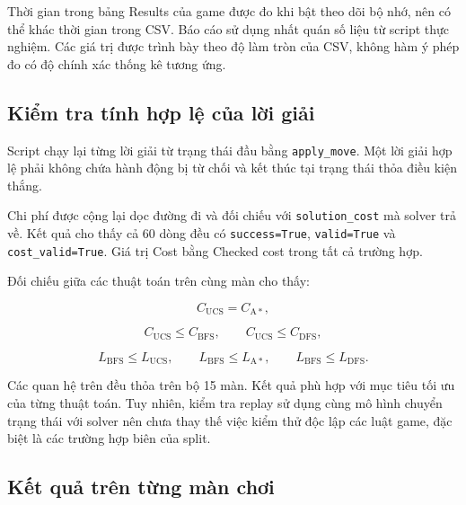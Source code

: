 Thời gian trong bảng Results của game được đo khi bật theo dõi
bộ nhớ, nên có thể khác thời gian trong CSV. Báo cáo sử dụng
nhất quán số liệu từ script thực nghiệm. Các giá trị được
trình bày theo độ làm tròn của CSV, không hàm ý phép đo có
độ chính xác thống kê tương ứng.

\subsection{Kiểm tra tính hợp lệ của lời giải}

Script chạy lại từng lời giải từ trạng thái đầu bằng
\texttt{apply\_move}. Một lời giải hợp lệ phải không chứa
hành động bị từ chối và kết thúc tại trạng thái thỏa
điều kiện thắng.

Chi phí được cộng lại dọc đường đi và đối chiếu với
\texttt{solution\_cost} mà solver trả về. Kết quả cho thấy
cả 60 dòng đều có \texttt{success=True},
\texttt{valid=True} và \texttt{cost\_valid=True}.
Giá trị Cost bằng Checked cost trong tất cả trường hợp.

Đối chiếu giữa các thuật toán trên cùng màn cho thấy:

\[
C_{\mathrm{UCS}}=C_{\mathrm{A*}},
\]

\[
C_{\mathrm{UCS}}\le C_{\mathrm{BFS}},
\qquad
C_{\mathrm{UCS}}\le C_{\mathrm{DFS}},
\]

\[
L_{\mathrm{BFS}}\le L_{\mathrm{UCS}},
\qquad
L_{\mathrm{BFS}}\le L_{\mathrm{A*}},
\qquad
L_{\mathrm{BFS}}\le L_{\mathrm{DFS}}.
\]

Các quan hệ trên đều thỏa trên bộ 15 màn. Kết quả phù hợp với
mục tiêu tối ưu của từng thuật toán. Tuy nhiên, kiểm tra replay
sử dụng cùng mô hình chuyển trạng thái với solver nên chưa
thay thế việc kiểm thử độc lập các luật game, đặc biệt là
các trường hợp biên của split.

\subsection{Kết quả trên từng màn chơi}

